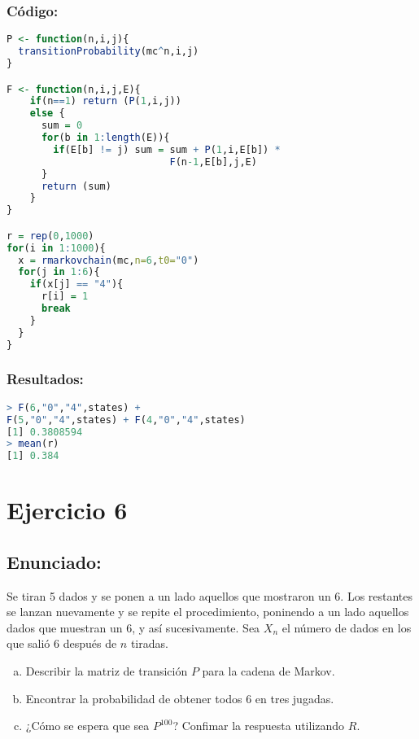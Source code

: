 \documentclass{article}
\begin{document}
\begin{enumerate}[(a)]
\subsubsection*{Código:}
\begin{lstlisting}[language=R]
P <- function(n,i,j){
  transitionProbability(mc^n,i,j)
}

F <- function(n,i,j,E){
    if(n==1) return (P(1,i,j))
    else {
      sum = 0
      for(b in 1:length(E)){
        if(E[b] != j) sum = sum + P(1,i,E[b]) * 
                            F(n-1,E[b],j,E)
      }
      return (sum)
    }
}

r = rep(0,1000)
for(i in 1:1000){
  x = rmarkovchain(mc,n=6,t0="0")
  for(j in 1:6){
    if(x[j] == "4"){
      r[i] = 1
      break  
    } 
  }
}

\end{lstlisting}

\subsubsection*{Resultados:}
\begin{lstlisting}[language=R]
> F(6,"0","4",states) + 
F(5,"0","4",states) + F(4,"0","4",states)
[1] 0.3808594
> mean(r)
[1] 0.384
\end{lstlisting}


\end{enumerate}


\section*{Ejercicio 6}
\subsection*{Enunciado:}
Se tiran 5 dados y se ponen a un lado aquellos que mostraron un 6. Los restantes se lanzan nuevamente y se repite el procedimiento, poninendo a un lado aquellos dados que muestran un 6, y así sucesivamente.
Sea $X_n$ el número de dados en los que salió 6 después de $n$ tiradas.



\begin{enumerate}[(a)] 

\item Describir la matriz de transición $P$ para la cadena de Markov.
\item Encontrar la probabilidad de obtener todos 6 en tres jugadas.
\item ¿Cómo se espera que sea $P^{100}$? Confimar la respuesta utilizando $R$.
\end{enumerate}
\end{document}
